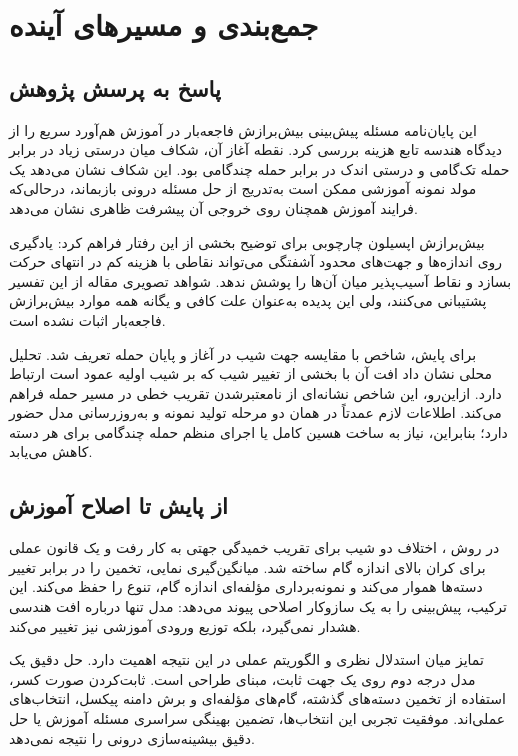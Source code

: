\chapter{جمع‌بندی و مسیرهای آینده}
\label{ch:conclusions}

\section{پاسخ به پرسش پژوهش}
این پایان‌نامه مسئله پیش‌بینی بیش‌برازش فاجعه‌بار در آموزش هم‌آورد سریع را از دیدگاه هندسه تابع هزینه بررسی کرد. نقطه آغاز آن، شکاف میان درستی زیاد در برابر حمله تک‌گامی و درستی اندک در برابر حمله چندگامی بود. این شکاف نشان می‌دهد یک مولد نمونه آموزشی ممکن است به‌تدریج از حل مسئله درونی بازبماند، درحالی‌که فرایند آموزش همچنان روی خروجی آن پیشرفت ظاهری نشان می‌دهد.

بیش‌برازش اپسیلون چارچوبی برای توضیح بخشی از این رفتار فراهم کرد: یادگیری روی اندازه‌ها و جهت‌های محدود آشفتگی می‌تواند نقاطی با هزینه کم در انتهای حرکت بسازد و نقاط آسیب‌پذیر میان آن‌ها را پوشش ندهد. شواهد تصویری مقاله از این تفسیر پشتیبانی می‌کنند، ولی این پدیده به‌عنوان علت کافی و یگانه همه موارد بیش‌برازش فاجعه‌بار اثبات نشده است.

برای پایش، شاخص \pertalign{} با مقایسه جهت شیب در آغاز و پایان حمله تعریف شد. تحلیل محلی نشان داد افت آن با بخشی از تغییر شیب که بر شیب اولیه عمود است ارتباط دارد. ازاین‌رو، این شاخص نشانه‌ای از نامعتبرشدن تقریب خطی در مسیر حمله فراهم می‌کند. اطلاعات لازم عمدتاً در همان دو مرحله تولید نمونه و به‌روزرسانی مدل حضور دارد؛ بنابراین، نیاز به ساخت هسین کامل یا اجرای منظم حمله چندگامی برای هر دسته کاهش می‌یابد.

\section{از پایش تا اصلاح آموزش}
در روش \sora{}، اختلاف دو شیب برای تقریب خمیدگی جهتی به کار رفت و یک قانون عملی برای کران بالای اندازه گام ساخته شد. میانگین‌گیری نمایی، تخمین را در برابر تغییر دسته‌ها هموار می‌کند و نمونه‌برداری مؤلفه‌ای اندازه گام، تنوع را حفظ می‌کند. این ترکیب، پیش‌بینی را به یک سازوکار اصلاحی پیوند می‌دهد: مدل تنها درباره افت هندسی هشدار نمی‌گیرد، بلکه توزیع ورودی آموزشی نیز تغییر می‌کند.

تمایز میان استدلال نظری و الگوریتم عملی در این نتیجه اهمیت دارد. حل دقیق یک مدل درجه دوم روی یک جهت ثابت، مبنای طراحی است. ثابت‌کردن صورت کسر، استفاده از تخمین دسته‌های گذشته، گام‌های مؤلفه‌ای و برش دامنه پیکسل، انتخاب‌های عملی‌اند. موفقیت تجربی این انتخاب‌ها، تضمین بهینگی سراسری مسئله آموزش یا حل دقیق بیشینه‌سازی درونی را نتیجه نمی‌دهد.


